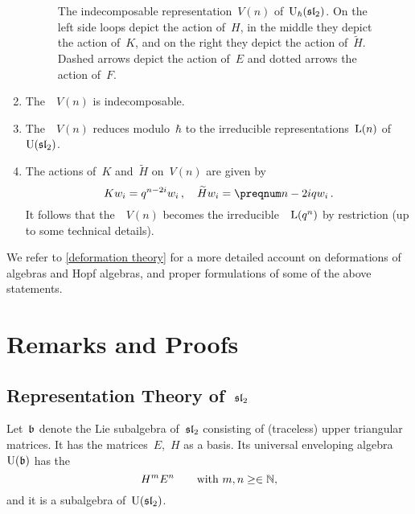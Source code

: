 \documentclass[a4paper, 11pt, oneside]{scrartcl}
\begin{document}
\begin{theorem}
\begin{enumerate}
\begin{figure}
\begin{center}
\begin{tikzpicture}[
              yscale = 1.3,
              bendy/.style = {bend right = 25},
              loopy/.style = {out = 190, in = 170, looseness = 40}
            ]
          \end{tikzpicture}
        \end{center}
        \caption{%
          The indecomposable representation~$V(n)$ of~$\Univ_{\hbar}(\sllie_2)$.
          On the left side loops depict the action of~$H$, in the middle they depict the action of~$K$, and on the right they depict the action of~$\widetilde{H}$.
          Dashed arrows depict the action of~$E$ and dotted arrows the action of~$F$.
        }
        \label{graphical representation of deformed representations}
      \end{figure}
    \item
      The~~$V(n)$ is indecomposable.
    \item
      The~~$V(n)$ reduces modulo~$\hbar$ to the irreducible representations~$\irred(n)$ of~$\Univ(\sllie_2)$.
    \item
      The actions of~$K$ and~$\widetilde{H}$ on~$V(n)$ are given by
      \[
        K w_i
        =
        q^{n - 2i} w_i \,,
        \quad
        \widetilde{H} w_i
        =
        \qnum{n - 2i} w_i \,.
      \]
      It follows that the~~$V(n)$ becomes the irreducible~~$\irred(q^n)$ by restriction (up to some technical details).
  \end{enumerate}
\end{theorem}

We refer to \cref{deformation theory} for a more detailed account on deformations of algebras and Hopf algebras, and proper formulations of some of the above statements.





\clearpage
\appendix





\section{Remarks and Proofs}



\subsection{Representation Theory of~\texorpdfstring{$\sllie_2$}{sl2}}
\label{appendix representation theory of sl2}

Let~$\blie$ denote the Lie subalgebra of~$\sllie_2$ consisting of (traceless) upper triangular matrices.
It has the matrices~$E$,~$H$ as a basis.
Its universal enveloping algebra~$\Univ(\blie)$ has the~{\PBWbasis}
\[
  H^m E^n
  \qquad
  \text{with $m, n \geq \in \Natural$,}
\]
and it is a subalgebra of~$\Univ(\sllie_2)$.
\end{document}
